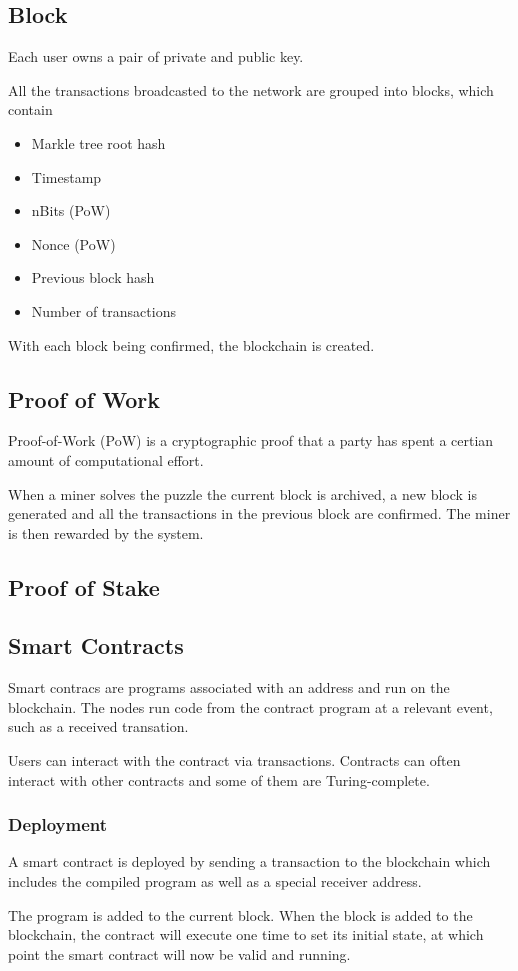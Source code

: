 \documentclass[../documentation.tex]{subfiles}
\begin{document}
\subsection{Block}

Each user owns a pair of private and public key.

All the transactions broadcasted to the network are grouped into blocks, which contain

\begin{itemize}
    \item Markle tree root hash
    \item Timestamp
    \item nBits (PoW)
    \item Nonce (PoW)
    \item Previous block hash
    \item Number of transactions
\end{itemize}

With each block being confirmed, the blockchain is created.

\subsection{Proof of Work}

Proof-of-Work (PoW) is a cryptographic proof that a party has spent
a certian amount of computational effort.

When a miner solves the puzzle the current block is archived, a new
block is generated and all the transactions in the previous block are confirmed.
The miner is then rewarded by the system.

\subsection{Proof of Stake}

\subsection{Smart Contracts}

Smart contracs are programs associated with an address and run on the blockchain.
The nodes run code from the contract program at a relevant event, such as a received transation.

Users can interact with the contract via transactions. Contracts can often interact with other contracts
and some of them are Turing-complete.

\subsubsection{Deployment}

A smart contract is deployed by sending a transaction to the blockchain which includes the compiled program
as well as a special receiver address.

The program is added to the current block. When the block is added to the blockchain, the contract
will execute one time to set its initial state, at which point the smart contract will now be valid and running.
\end{document}
